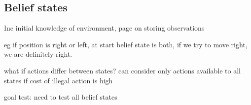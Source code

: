 
\subsection{Belief states}

Inc initial knowledge of environment, page on storing observations


eg if position is right or left, at start belief state is both, if we try to move right, we are definitely right.

what if actions differ between states? can consider only actions available to all states if cost of illegal action is high

goal test: need to test all belief states

